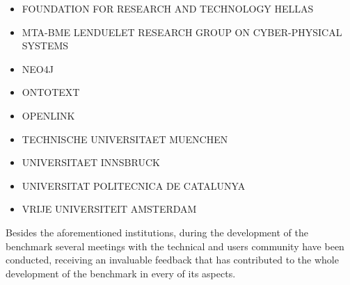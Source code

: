\begin{itemize}
    \item FOUNDATION FOR RESEARCH AND TECHNOLOGY HELLAS
    \item MTA-BME LENDUELET RESEARCH GROUP ON CYBER-PHYSICAL SYSTEMS
    \item NEO4J
    \item ONTOTEXT
    \item OPENLINK
    \item TECHNISCHE UNIVERSITAET MUENCHEN
    \item UNIVERSITAET INNSBRUCK
    \item UNIVERSITAT POLITECNICA DE CATALUNYA
    \item VRIJE UNIVERSITEIT AMSTERDAM
\end{itemize}

\begin{figure}
\end{figure}

Besides the aforementioned institutions, during the development of the
benchmark several meetings with the technical and users community have been
conducted, receiving an invaluable feedback that has contributed to the whole
development of the benchmark in every of its aspects.

